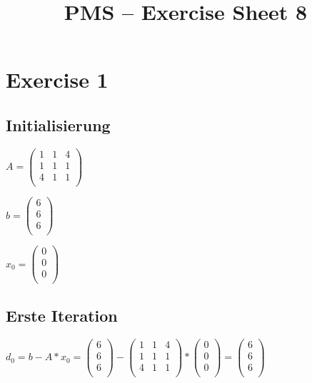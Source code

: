 \documentclass[10pt,DIV10,a4paper]{scrartcl}
\title{PMS -- Exercise Sheet 8}
\date{}
\begin{document}
\maketitle

\section*{Exercise 1}

\subsection*{Initialisierung}

\(A=\left(
\begin{array}{ccc}
 1 & 1 & 4 \\
 1 & 1 & 1 \\
 4 & 1 & 1 \\
\end{array}
\right)\)

\(b=\left(
\begin{array}{c}
 6 \\
 6 \\
 6 \\
\end{array}
\right)\)

\(x_0=\left(
\begin{array}{c}
 0 \\
 0 \\
 0 \\
\end{array}
\right)\)

\subsection*{Erste Iteration}

\(d_0=b - A * x_0 = \left(
\begin{array}{c}
 6 \\
 6 \\
 6 \\
\end{array}
\right)-\left(
\begin{array}{ccc}
 1 & 1 & 4 \\
 1 & 1 & 1 \\
 4 & 1 & 1 \\
\end{array}
\right)*\left(
\begin{array}{c}
 0 \\
 0 \\
 0 \\
\end{array}
\right)=\left(
\begin{array}{c}
 6 \\
 6 \\
 6 \\
\end{array}
\right)\)
\end{document}
